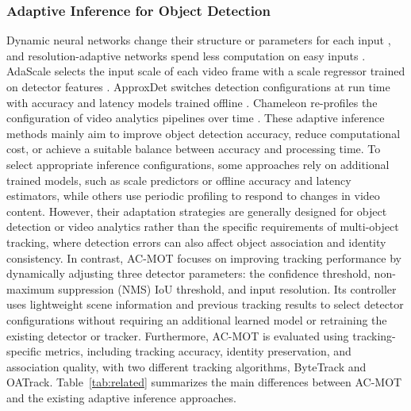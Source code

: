 \documentclass[pdflatex,sn-mathphys-num,iicol]{sn-jnl}
\begin{document}
\subsubsection{Adaptive Inference for Object Detection}
Dynamic neural networks change their structure or parameters for each input
\cite{han2022dynamic}, and resolution-adaptive networks spend less computation
on easy inputs \cite{yang2020ranet}. AdaScale selects the input scale of each
video frame with a scale regressor trained on detector features
\cite{chin2019adascale}. ApproxDet switches detection configurations at run
time with accuracy and latency models trained offline \cite{xu2020approxdet}.
Chameleon re-profiles the configuration of video analytics pipelines over time
\cite{jiang2018chameleon}. These adaptive inference methods mainly aim to improve object detection accuracy, reduce computational cost, or achieve a suitable balance between accuracy and processing time. To select appropriate inference configurations, some approaches rely on additional trained models, such as scale predictors or offline accuracy and latency estimators, while others use periodic profiling to respond to changes in video content. However, their adaptation strategies are generally designed for object detection or video analytics rather than the specific requirements of multi-object tracking, where detection errors can also affect object association and identity consistency. In contrast, AC-MOT focuses on improving tracking performance by dynamically adjusting three detector parameters: the confidence threshold, non-maximum suppression (NMS) IoU threshold, and input resolution. Its controller uses lightweight scene information and previous tracking results to select detector configurations without requiring an additional learned model or retraining the existing detector or tracker. Furthermore, AC-MOT is evaluated using tracking-specific metrics, including tracking accuracy, identity preservation, and association quality, with two different tracking algorithms, ByteTrack and OATrack. Table~\ref{tab:related} summarizes the main differences between AC-MOT and the existing adaptive inference approaches.
\end{document}
